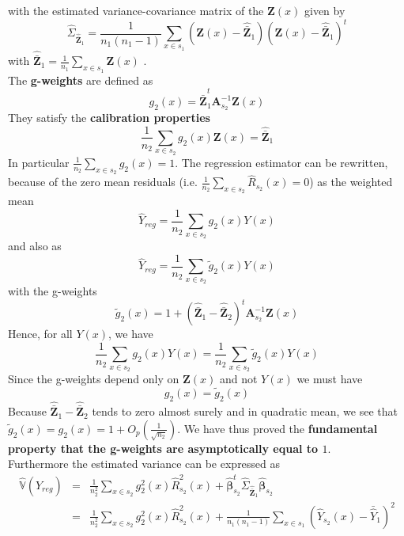 \documentclass[a4paper,12pt,leqno, titlepage]{article}
\newcommand{\VAR}{\mathbb{V}}
\begin{document}
with the estimated variance-covariance matrix of the $\pmb{Z}(x)$ given by
\begin{equation}\label{estvarcovaux}
\hat{\Sigma}_{\hat{\bar{\pmb{Z}}}_{1}}=
\frac{1}{n_{1}(n_{1}-1)}\sum_{x\in{s_{1}}}
(\pmb{Z}(x)-\hat{\bar{\pmb{Z}}}_{1})(\pmb{Z}(x)-\hat{\bar{\pmb{Z}}}_{1})^t
\end{equation}
with $\hat{\bar{\pmb{Z}}}_1=\frac{1}{n_1}\sum_{x\in{s_1}}\pmb{Z}(x)$ .\\
The \textbf{g-weights} are defined as
\begin{equation}\label{gweight1}
g_{2}(x)=\hat{\bar{\pmb{Z}}}^t_{1}\pmb{A}^{-1}_{s_2}\pmb{Z}(x)
\end{equation}
They satisfy the \textbf{calibration properties}
\begin{equation}\label{gweight2}
\frac{1}{n_2}\sum_{x\in{s_2}}g_2(x)\pmb{Z}(x)=\hat{\bar{\pmb{Z}}}_{1}
\end{equation}
\noindent In particular $\frac{1}{n_2}\sum_{x\in{s_2}}g_2(x)=1$. The regression estimator can be rewritten, because of the zero mean residuals (i.e. $\frac{1}{n_2}\sum_{x\in{s_2}}\hat{R}_{s_2}(x)=0$) as the weighted mean
\begin{equation}\label{gweight3}
\hat{Y}_{reg}=\frac{1}{n_2}\sum_{x\in{s_2}}g_{2}(x)Y(x)
\end{equation}
and also as
\begin{equation}\label{gweight3bis}
\hat{Y}_{reg}=\frac{1}{n_2}\sum_{x\in{s_2}}\tilde{g}_{2}(x)Y(x)
\end{equation}
with the g-weights
\begin{equation}\label{gweight3bis}
\tilde{g}_{2}(x)=1+(\hat{\bar{\pmb{Z}}}_{1}-\hat{\bar{\pmb{Z}}}_{2})^t\pmb{A}^{-1}_{s_2}\pmb{Z}(x)
\end{equation}
Hence, for all $Y(x)$, we have
$$\frac{1}{n_2}\sum_{x\in{s_2}}g_{2}(x)Y(x)=\frac{1}{n_2}\sum_{x\in{s_2}}\tilde{g}_{2}(x)Y(x)$$
Since the g-weights depend only on $\pmb{Z}(x)$ and not $Y(x)$ we must have
\begin{equation}\label{equalityofgweights}
g_2(x)=\tilde{g}_{2}(x)
\end{equation}
Because $\hat{\bar{\pmb{Z}}}_{1}-\hat{\bar{\pmb{Z}}}_{2}$ tends to zero almost surely and in quadratic mean, we see that $\tilde{g}_{2}(x)=g_2(x)=1+O_p(\frac{1}{\sqrt{n_2}})$. We have thus proved the \textbf{fundamental property that the g-weights are asymptotically equal to $1$}.\\
Furthermore the estimated variance can be expressed as
\begin{eqnarray}\label{gweight4}
\hat{\VAR}(\hat{Y}_{reg})&=&\frac{1}{n^2_2}\sum_{x\in{s_2}}g^2_{2}(x)\hat{R}_{s_2}^2(x) + \hat{\pmb{\beta}}_{s_2}^t\hat{\Sigma}_{\hat{\bar{\pmb{Z}}}_{1}}\hat{\pmb{\beta}}_{s_2}  \nonumber \\
&=& \frac{1}{n^2_2}\sum_{x\in{s_2}}g^2_{2}(x)\hat{R}_{s_2}^2(x)+ \frac{1}{n_{1}(n_{1}-1)}
\sum_{x\in{s_{1}}}(\hat{Y}_{s_2}(x)-\bar{\hat{Y}}_{1})^2
\end{eqnarray}
\end{document}
